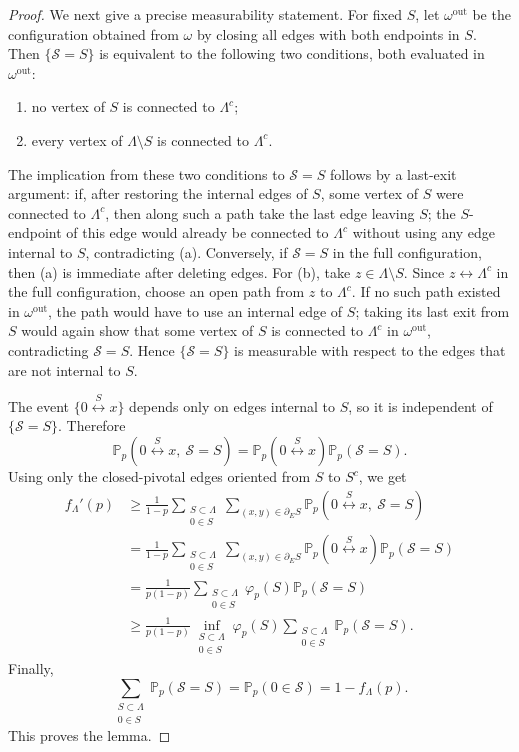 \documentclass[11pt]{article}
\newcommand{\Pp}{\mathbb P_p}
\newcommand{\conn}{\longleftrightarrow}
\newcommand{\phip}{\varphi_p}
\begin{document}
\begin{proof}
We next give a precise measurability statement. For fixed $S$, let $\omega^{\mathrm{out}}$ be the configuration obtained from $\omega$ by closing all edges with both endpoints in $S$. Then $\{\mathscr S=S\}$ is equivalent to the following two conditions, both evaluated in $\omega^{\mathrm{out}}$:
\begin{enumerate}[label=(\alph*)]
\item no vertex of $S$ is connected to $\Lambda^c$;
\item every vertex of $\Lambda\setminus S$ is connected to $\Lambda^c$.
\end{enumerate}
The implication from these two conditions to $\mathscr S=S$ follows by a last-exit argument: if, after restoring the internal edges of $S$, some vertex of $S$ were connected to $\Lambda^c$, then along such a path take the last edge leaving $S$; the $S$-endpoint of this edge would already be connected to $\Lambda^c$ without using any edge internal to $S$, contradicting (a). Conversely, if $\mathscr S=S$ in the full configuration, then (a) is immediate after deleting edges. For (b), take $z\in\Lambda\setminus S$. Since $z\conn\Lambda^c$ in the full configuration, choose an open path from $z$ to $\Lambda^c$. If no such path existed in $\omega^{\mathrm{out}}$, the path would have to use an internal edge of $S$; taking its last exit from $S$ would again show that some vertex of $S$ is connected to $\Lambda^c$ in $\omega^{\mathrm{out}}$, contradicting $\mathscr S=S$. Hence $\{\mathscr S=S\}$ is measurable with respect to the edges that are not internal to $S$.

The event $\{0\stackrel{S}{\conn}x\}$ depends only on edges internal to $S$, so it is independent of $\{\mathscr S=S\}$. Therefore
\[
 \Pp(0\stackrel{S}{\conn}x,\ \mathscr S=S)
 =
 \Pp(0\stackrel{S}{\conn}x)\Pp(\mathscr S=S).
\]
Using only the closed-pivotal edges oriented from $S$ to $S^c$, we get
\begin{align*}
 f_\Lambda'(p)
 &\ge
 \frac1{1-p}
 \sum_{\substack{S\subset\Lambda\\0\in S}}
 \sum_{(x,y)\in\partial_E S}
 \Pp(0\stackrel{S}{\conn}x,\ \mathscr S=S)\\
 &=
 \frac1{1-p}
 \sum_{\substack{S\subset\Lambda\\0\in S}}
 \sum_{(x,y)\in\partial_E S}
 \Pp(0\stackrel{S}{\conn}x)\Pp(\mathscr S=S)\\
 &=
 \frac1{p(1-p)}
 \sum_{\substack{S\subset\Lambda\\0\in S}}
 \phip(S)\Pp(\mathscr S=S)\\
 &\ge
 \frac1{p(1-p)}
 \inf_{\substack{S\subset\Lambda\\0\in S}}\phip(S)
 \sum_{\substack{S\subset\Lambda\\0\in S}}\Pp(\mathscr S=S).
\end{align*}
Finally,
\[
 \sum_{\substack{S\subset\Lambda\\0\in S}}\Pp(\mathscr S=S)
 =
 \Pp(0\in\mathscr S)
 =
 1-f_\Lambda(p).
\]
This proves the lemma.
\end{proof}
\end{document}
